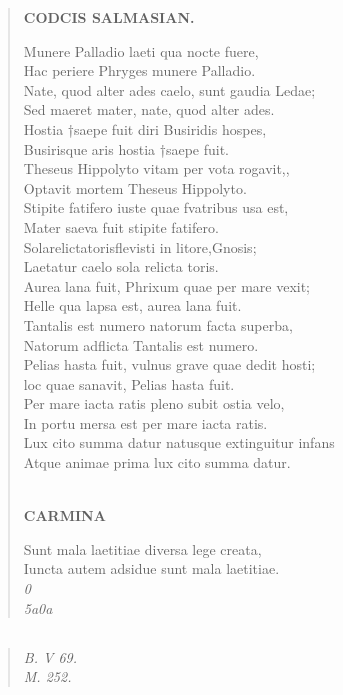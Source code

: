\documentclass[11pt, a4paper]{report}
\begin{document}
\begin{verse}
    \begin{center} \textbf{CODCIS SALMASIAN.} \end{center} \marginpar{[193]} Munere Palladio laeti qua nocte fuere, \\ Hac periere Phryges munere Palladio. \\ Nate, quod alter ades caelo, sunt gaudia Ledae; \\ Sed maeret mater, nate, quod alter ades. \\ Hostia †saepe fuit diri Busiridis hospes, \\ Busirisque aris hostia †saepe fuit. \\ Theseus Hippolyto vitam per vota rogavit,, \\ Optavit mortem Theseus Hippolyto. \\ Stipite fatifero iuste quae fvatribus usa est, \\ Mater saeva fuit stipite fatifero. \\ Solarelictatorisflevisti \lbrack in \rbrack litore,Gnosis; \\ Laetatur caelo sola relicta toris. \\ Aurea lana fuit, Phrixum quae per mare vexit; \\ Helle qua lapsa est, aurea lana fuit. \\ Tantalis est numero natorum facta superba, \\ Natorum adflicta Tantalis est numero. \\ Pelias hasta fuit, vulnus grave quae dedit hosti; \\ loc quae sanavit, Pelias hasta fuit. \\ Per mare iacta ratis pleno subit ostia velo, \\ In portu mersa est per mare iacta ratis. \\ Lux cito summa datur natusque extinguitur infans \\ Atque animae prima lux cito summa datur. \\ 
        ﻿\pagebreak 
    \begin{center} \textbf{CARMINA} \end{center} \marginpar{[194]} Sunt mala laetitiae diversa lege creata, \\ Iuncta autem adsidue sunt mala laetitiae. \\ \textit{0} \\ \textit{5a0a} \\ 
      \end{verse}
  
            \subsection*{}
      \begin{verse}
      \textit{B. V 69.} \\ \textit{M. 252.} \\ 
      \end{verse}
  
\end{document}
